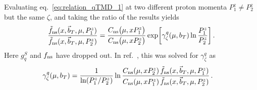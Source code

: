 \documentclass[11pt,a4paper]{article}
\DeclareRobustCommand{\eq}[1]{eq.~\eqref{eq:#1}}
\DeclareRobustCommand{\mycite}[1]{ref.~\cite{#1}}
\newcommand{\bt}{\vec b_T}
\newcommand{\ns}{{\rm ns}}
\begin{document}
Evaluating \eq{relation_qTMD_1} at two different proton
momenta $P^z_1 \ne P^z_2$ but the same $\zeta$,
and taking the ratio of the results yields
\begin{align} \label{eq:relation_qTMD_2}
 \frac{\tilde f_{\ns}(x, \bt, \mu, P^z_1)}{\tilde f_{\ns}(x, \bt, \mu, P^z_2)}
 = \frac{C_{\ns}\bigl(\mu, x P^z_1\bigr)}{C_{\ns}\bigl(\mu, x P^z_2\bigr)}
   \exp\biggl[ \gamma_\zeta^q(\mu, b_T) \ln\frac{P^z_1}{P^z_2} \biggr]
\,.\end{align}
Here $g_q^S$ and $f_{\ns}$ have dropped out.
In \mycite{Ebert:2018gzl}, this was solved for $\gamma_\zeta^q$ as
\begin{align} \label{eq:gamma_zeta_1}
 \gamma^q_\zeta(\mu, b_T) &= \frac{1}{\ln(P^z_1/P^z_2)}
  \ln \frac{C_\ns(\mu,x P_2^z)\, \tilde f_\ns(x, \bt, \mu, P^z_1)}
           {C_\ns(\mu,x P_1^z)\, \tilde f_\ns(x, \bt, \mu, P^z_2)}
\,.\end{align}
\end{document}
